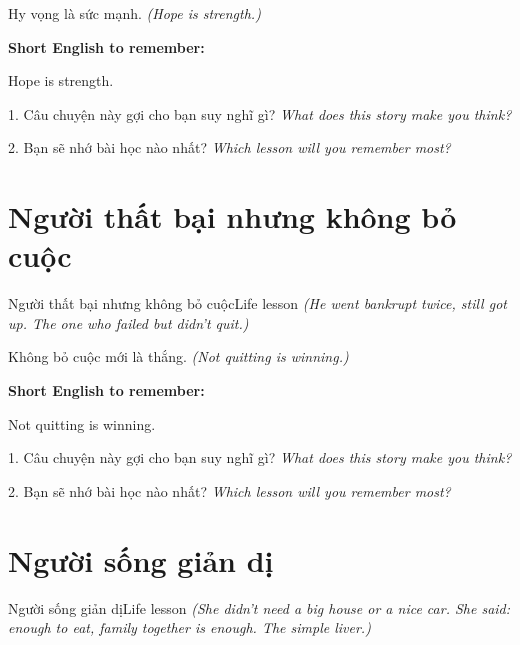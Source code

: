 \begin{baihoc}
Hy vọng là sức mạnh.
\textit{(Hope is strength.)}
\end{baihoc}

\begin{ghinhoanh}
\textbf{Short English to remember:}

Hope is strength.

\end{ghinhoanh}

\begin{tuhocnhanh}
1. Câu chuyện này gợi cho bạn suy nghĩ gì? \textit{What does this story make you think?}

2. Bạn sẽ nhớ bài học nào nhất? \textit{Which lesson will you remember most?}
\end{tuhocnhanh}
\ngancach


\section{Người thất bại nhưng không bỏ cuộc}
\begin{truyen}{Người thất bại nhưng không bỏ cuộc}{Life lesson}
\textit{(He went bankrupt twice, still got up. The one who failed but didn't quit.)}
\end{truyen}

\begin{baihoc}
Không bỏ cuộc mới là thắng.
\textit{(Not quitting is winning.)}
\end{baihoc}

\begin{ghinhoanh}
\textbf{Short English to remember:}

Not quitting is winning.

\end{ghinhoanh}

\begin{tuhocnhanh}
1. Câu chuyện này gợi cho bạn suy nghĩ gì? \textit{What does this story make you think?}

2. Bạn sẽ nhớ bài học nào nhất? \textit{Which lesson will you remember most?}
\end{tuhocnhanh}
\ngancach


\section{Người sống giản dị}
\begin{truyen}{Người sống giản dị}{Life lesson}
\textit{(She didn't need a big house or a nice car. She said: enough to eat, family together is enough. The simple liver.)}
\end{truyen}

